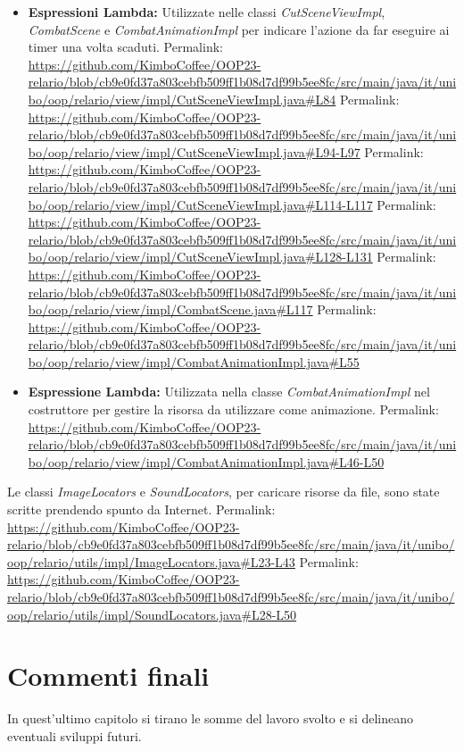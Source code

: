 \documentclass[a4paper,12pt]{report}
\begin{document}
\begin{itemize}
	\item \textbf{Espressioni Lambda:} Utilizzate nelle classi \textit{CutSceneViewImpl}, \textit{CombatScene} e \textit{CombatAnimationImpl} per indicare l'azione da far eseguire ai timer una volta scaduti.
	Permalink: \url{https://github.com/KimboCoffee/OOP23-relario/blob/cb9e0fd37a803cebfb509ff1b08d7df99b5ee8fc/src/main/java/it/unibo/oop/relario/view/impl/CutSceneViewImpl.java#L84}
	Permalink: \url{https://github.com/KimboCoffee/OOP23-relario/blob/cb9e0fd37a803cebfb509ff1b08d7df99b5ee8fc/src/main/java/it/unibo/oop/relario/view/impl/CutSceneViewImpl.java#L94-L97}
	Permalink: \url{https://github.com/KimboCoffee/OOP23-relario/blob/cb9e0fd37a803cebfb509ff1b08d7df99b5ee8fc/src/main/java/it/unibo/oop/relario/view/impl/CutSceneViewImpl.java#L114-L117}
	Permalink: \url{https://github.com/KimboCoffee/OOP23-relario/blob/cb9e0fd37a803cebfb509ff1b08d7df99b5ee8fc/src/main/java/it/unibo/oop/relario/view/impl/CutSceneViewImpl.java#L128-L131}
	Permalink: \url{https://github.com/KimboCoffee/OOP23-relario/blob/cb9e0fd37a803cebfb509ff1b08d7df99b5ee8fc/src/main/java/it/unibo/oop/relario/view/impl/CombatScene.java#L117}
	Permalink: \url{https://github.com/KimboCoffee/OOP23-relario/blob/cb9e0fd37a803cebfb509ff1b08d7df99b5ee8fc/src/main/java/it/unibo/oop/relario/view/impl/CombatAnimationImpl.java#L55}
	\item \textbf{Espressione Lambda:} Utilizzata nella classe \textit{CombatAnimationImpl} nel costruttore per gestire la risorsa da utilizzare come animazione.
	Permalink: \url{https://github.com/KimboCoffee/OOP23-relario/blob/cb9e0fd37a803cebfb509ff1b08d7df99b5ee8fc/src/main/java/it/unibo/oop/relario/view/impl/CombatAnimationImpl.java#L46-L50}
\end{itemize}

Le classi \textit{ImageLocators} e \textit{SoundLocators}, per caricare risorse da file, sono state scritte prendendo spunto da Internet.
Permalink: \url{https://github.com/KimboCoffee/OOP23-relario/blob/cb9e0fd37a803cebfb509ff1b08d7df99b5ee8fc/src/main/java/it/unibo/oop/relario/utils/impl/ImageLocators.java#L23-L43}
Permalink: \url{https://github.com/KimboCoffee/OOP23-relario/blob/cb9e0fd37a803cebfb509ff1b08d7df99b5ee8fc/src/main/java/it/unibo/oop/relario/utils/impl/SoundLocators.java#L28-L50}

\chapter{Commenti finali}

In quest'ultimo capitolo si tirano le somme del lavoro svolto e si delineano eventuali sviluppi
futuri.
\end{document}

